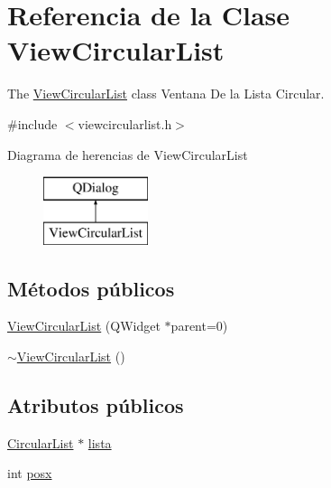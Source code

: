 \hypertarget{class_view_circular_list}{}\section{Referencia de la Clase View\+Circular\+List}
\label{class_view_circular_list}


The \mbox{\hyperlink{class_view_circular_list}{View\+Circular\+List}} class Ventana De la Lista Circular.  




{\ttfamily \#include $<$viewcircularlist.\+h$>$}

Diagrama de herencias de View\+Circular\+List\begin{figure}[H]
\begin{center}
\leavevmode
\includegraphics[height=2.000000cm]{class_view_circular_list}
\end{center}
\end{figure}
\subsection*{Métodos públicos}
\begin{DoxyCompactItemize}
\item 
\mbox{\hyperlink{class_view_circular_list_a5c2f50cf83d080aef15678bcf9b51ee1}{View\+Circular\+List}} (Q\+Widget $\ast$parent=0)
\item 
\mbox{\hyperlink{class_view_circular_list_a3daf1e98019445c90f6b12d5e0083092}{$\sim$\+View\+Circular\+List}} ()
\end{DoxyCompactItemize}
\subsection*{Atributos públicos}
\begin{DoxyCompactItemize}
\item 
\mbox{\hyperlink{class_circular_list}{Circular\+List}} $\ast$ \mbox{\hyperlink{class_view_circular_list_a10f35f007af0844f3966340a74542d3f}{lista}}
\item 
int \mbox{\hyperlink{class_view_circular_list_a9dca774f51b7b6bab8515b862774315f}{posx}}
\end{DoxyCompactItemize}


